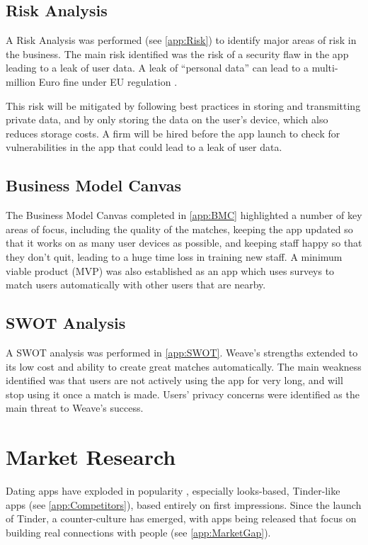 \documentclass[12pt, a4paper]{article}
\let\cite\shortcite
\newenvironment{main}
{\begin{spacing}{1.2}\setlength{\parskip}{0.5\baselineskip}}
{\end{spacing}\setlength{\parskip}{0pt}}
\begin{document}
\begin{main}
\subsection{Risk Analysis}
A Risk Analysis was performed (see \cref{app:Risk}) to identify major areas of risk in the business. The main risk identified was the risk of a security flaw in the app leading to a leak of user data. A leak of ``personal data'' can lead to a multi-million Euro fine under EU regulation \cite{EuDataProtection}.

This risk will be mitigated by following best practices in storing and transmitting private data, and by only storing the data on the user's device, which also reduces storage costs. A firm will be hired before the app launch to check for vulnerabilities in the app that could lead to a leak of user data.

\subsection{Business Model Canvas}
The Business Model Canvas completed in \cref{app:BMC} highlighted a number of key areas of focus, including the quality of the matches, keeping the app updated so that it works on as many user devices as possible, and keeping staff happy so that they don't quit, leading to a huge time loss in training new staff. A minimum viable product (MVP) was also established as an app which uses surveys to match users automatically with other users that are nearby.

\subsection{SWOT Analysis}
A SWOT analysis was performed in \cref{app:SWOT}. Weave's strengths extended to its low cost and ability to create great matches automatically. The main weakness identified was that users are not actively using the app for very long, and will stop using it once a match is made. Users' privacy concerns were identified as the main threat to Weave's success.

\section{Market Research}
Dating apps have exploded in popularity \cite{Mintel}, especially looks-based, Tinder-like apps (see \cref{app:Competitors}), based entirely on first impressions. Since the launch of Tinder, a counter-culture has emerged, with apps being released that focus on building real connections with people (see \cref{app:MarketGap}).


\end{main}
\end{document}
